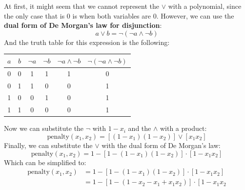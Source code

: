 \begin{examplebox}[: $x_{1} + x_{2} = 1$]
\begin{center}
\begin{tabular}{@{} c c c @{}}
        \end{tabular}
    \end{center}
    At first, it might seem that we cannot represent the $\lor$ with a polynomial, since the only case that is 0 is when both variables are 0. However, we can use the \textbf{dual form of De Morgan's law for disjunction}:
    \begin{equation*}
        a \lor b = \lnot \left(\lnot a \land \lnot b\right)
    \end{equation*}
    And the truth table for this expression is the following:
    \begin{center}
        \begin{tabular}{@{} c c c c c c @{}}
            \toprule
            $a$ & $b$ & $\lnot a$ & $\lnot b$ & $\lnot a \land \lnot b$ & $\lnot \left(\lnot a \land \lnot b\right)$ \\
            \midrule
            0 & 0 & 1 & 1 & 1 & 0 \\
            0 & 1 & 1 & 0 & 0 & 1 \\
            1 & 0 & 0 & 1 & 0 & 1 \\
            1 & 1 & 0 & 0 & 0 & 1 \\
            \bottomrule
        \end{tabular}
    \end{center}
    Now we can substitute the $\lnot$ with $1 - x_i$ and the $\land$ with a product:
    \begin{equation*}
        \text{penalty}(x_1, x_2) = \left[
            \left(1 - x_1\right)\left(1 - x_2\right)
        \right]
        \lor
        \left[
            x_1 x_2
        \right]
    \end{equation*}
    Finally, we can substitute the $\lor$ with the dual form of De Morgan's law:
    \begin{equation*}
        \text{penalty}(x_1, x_2) = 1 - \left[
            1 - \left(1 - x_1\right)\left(1 - x_2\right)
        \right]
        \cdot
        \left[
            1 - x_1 x_2
        \right]
    \end{equation*}
    Which can be simplified to:
    \begin{align*}
        \text{penalty}(x_1, x_2) & = 1 - \left[
            1 - \left(1 - x_1\right)\left(1 - x_2\right)
        \right]
        \cdot
        \left[
            1 - x_1 x_2
        \right] \\
        & = 1 - \left[
            1 - \left(1 -x_2 -x_1 +x_1 x_2\right)
        \right]
        \cdot
        \left[
            1 - x_1 x_2

\end{align*}
\end{examplebox}
